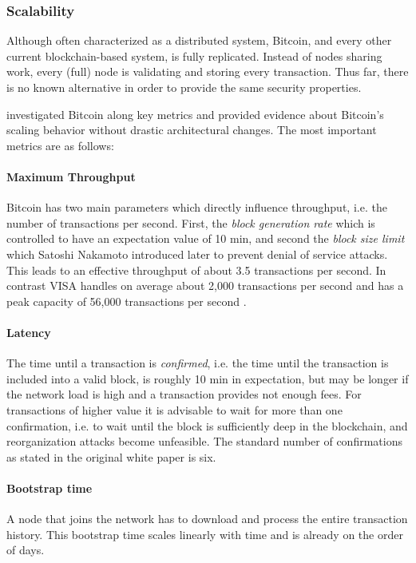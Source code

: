 \subsubsection{Scalability}

Although often characterized as a distributed system, Bitcoin, and every other current blockchain-based system, is fully replicated. Instead of nodes sharing work, every (full) node is validating and storing every transaction. Thus far, there is no known alternative in order to provide the same security properties.

\cite{croman2016scaling} investigated Bitcoin along key metrics and provided evidence about Bitcoin's scaling behavior without drastic architectural changes.
The most important metrics are as follows:
\paragraph{Maximum Throughput} 
Bitcoin has two main parameters which directly influence throughput, i.e. the number of transactions per second. First, the \emph{block generation rate} which is controlled to have an expectation value of 10 min, and second the \emph{block size limit} which Satoshi Nakamoto introduced later to prevent denial of service attacks. This leads to an effective throughput of about 3.5 transactions per second. In contrast VISA handles on average about 2,000 transactions per second and has a peak capacity of 56,000 transactions per second \cite{visa}. 
\paragraph{Latency} The time until a transaction is \emph{confirmed}, i.e. the time until the transaction is included into a valid block, is roughly 10 min in expectation, but may be longer if the network load is high and a transaction provides not enough fees. For transactions of higher value it is advisable to wait for more than one confirmation, i.e. to wait until the block is sufficiently deep in the blockchain, and reorganization attacks become unfeasible. The standard number of confirmations as stated in the original white paper is six. 
\paragraph{Bootstrap time} A node that joins the network has to download and process the entire transaction history. This bootstrap time scales linearly with time and is already on the order of days.


